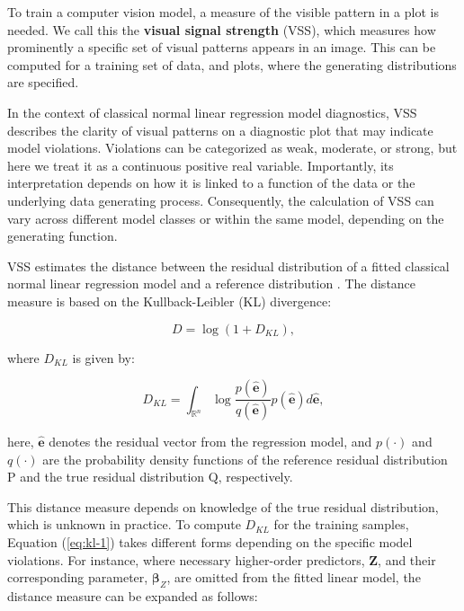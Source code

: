 \documentclass[
doublespace,
  times]{anzsauth}
\begin{document}
To train a computer vision model, a measure of the visible pattern in a
plot is needed. We call this the \textbf{visual signal strength} (VSS),
which measures how prominently a specific set of visual patterns appears
in an image. This can be computed for a training set of data, and plots,
where the generating distributions are specified.

In the context of classical normal linear regression model diagnostics,
VSS describes the clarity of visual patterns on a diagnostic plot that
may indicate model violations. Violations can be categorized as weak,
moderate, or strong, but here we treat it as a continuous positive real
variable. Importantly, its interpretation depends on how it is linked to
a function of the data or the underlying data generating process.
Consequently, the calculation of VSS can vary across different model
classes or within the same model, depending on the generating function.

VSS estimates the distance between the residual distribution of a fitted
classical normal linear regression model and a reference distribution
\citep[see][for details]{li2024automated}. The distance measure is based
on the Kullback-Leibler (KL) divergence:

\begin{equation*} \label{eq:kl-0}
D = \log\left(1 + D_{KL}\right),
\end{equation*}

where \(D_{KL}\) is given by:

\begin{equation} \label{eq:kl-1}
D_{KL} = \int_{\mathbb{R}^{n}}\log\frac{p(\hat{\boldsymbol{e}})}{q(\hat{\boldsymbol{e}})}p(\hat{\boldsymbol{e}})d\hat{\boldsymbol{e}},
\end{equation}

here, \(\hat{\boldsymbol{e}}\) denotes the residual vector from the
regression model, and \(p(\cdot)\) and \(q(\cdot)\) are the probability
density functions of the reference residual distribution \(\mathrm{P}\)
and the true residual distribution \(\mathrm{Q}\), respectively.

This distance measure depends on knowledge of the true residual
distribution, which is unknown in practice. To compute \(D_{KL}\) for
the training samples, Equation (\ref{eq:kl-1}) takes different forms
depending on the specific model violations. For instance, where
necessary higher-order predictors, \(\boldsymbol{Z}\), and their
corresponding parameter, \(\boldsymbol{\beta}_Z\), are omitted from the
fitted linear model, the distance measure can be expanded as follows:
\end{document}
